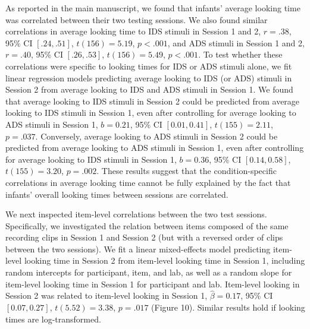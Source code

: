 \documentclass[
  english,
  man, donotrepeattitle,floatsintext]{apa6}
\begin{document}
As reported in the main manuscript, we found that infants' average looking time was correlated between their two testing sessions.
We also found similar correlations in average looking time to IDS stimuli in Session 1 and 2, \(r = .38\), 95\% CI \([.24, .51]\), \(t(156) = 5.19\), \(p < .001\), and ADS stimuli in Session 1 and 2, \(r = .40\), 95\% CI \([.26, .53]\), \(t(156) = 5.49\), \(p < .001\).
To test whether these correlations were specific to looking times for IDS or ADS stimuli alone, we fit linear regression models predicting average looking to IDS (or ADS) stimuli in Session 2 from average looking to IDS and ADS stimuli in Session 1.
We found that average looking to IDS stimuli in Session 2 could be predicted from average looking to IDS stimuli in Session 1, even after controlling for average looking to ADS stimuli in Session 1, \(b = 0.21\), 95\% CI \([0.01, 0.41]\), \(t(155) = 2.11\), \(p = .037\).
Conversely, average looking to ADS stimuli in Session 2 could be predicted from average looking to ADS stimuli in Session 1, even after controlling for average looking to IDS stimuli in Session 1, \(b = 0.36\), 95\% CI \([0.14, 0.58]\), \(t(155) = 3.20\), \(p = .002\).
These results suggest that the condition-specific correlations in average looking time cannot be fully explained by the fact that infants' overall looking times between sessions are correlated.

We next inspected item-level correlations between the two test sessions.
Specifically, we investigated the relation between items composed of the same recording clips in Session 1 and Session 2 (but with a reversed order of clips between the two sessions).
We fit a linear mixed-effects model predicting item-level looking time in Session 2 from item-level looking time in Session 1, including random intercepts for participant, item, and lab, as well as a random slope for item-level looking time in Session 1 for participant and lab.
Item-level looking in Session 2 was related to item-level looking in Session 1, \(\hat{\beta} = 0.17\), 95\% CI \([0.07, 0.27]\), \(t(5.52) = 3.38\), \(p = .017\) (Figure 10).
Similar results hold if looking times are log-transformed.
\end{document}
